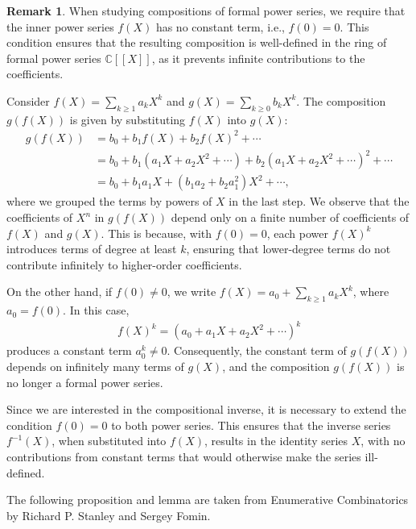 \documentclass[a4paper]{article}
\theoremstyle{definition}
\newtheorem*{remark}{Remark}
\begin{document}
\begin{remark}
    When studying compositions of formal power series, we require that the inner power series \(f(X)\) has no constant term, i.e., \(f(0) = 0\). This condition ensures that the resulting composition is well-defined in the ring of formal power series \(\mathbb{C}[[X]]\), as it prevents infinite contributions to the coefficients.

    Consider \(f(X) = \sum_{k \geq 1} a_k X^k\) and \(g(X) = \sum_{k \geq 0} b_k X^k\). The composition \(g(f(X))\) is given by substituting \(f(X)\) into \(g(X)\):
    \begin{align*}
        g(f(X)) &= b_0 + b_1 f(X) + b_2 f(X)^2 + \cdots \\
        &= b_0 + b_1 (a_1 X + a_2 X^2 + \cdots) + b_2 (a_1 X + a_2 X^2 + \cdots)^2 + \cdots \\
        &= b_0 + b_1 a_1 X + (b_1 a_2 + b_2 a_1^2) X^2 + \cdots,
    \end{align*}
    where we grouped the terms by powers of \(X\) in the last step. We observe that the coefficients of \(X^n\) in \(g(f(X))\) depend only on a finite number of coefficients of \(f(X)\) and \(g(X)\). This is because, with \(f(0) = 0\), each power \(f(X)^k\) introduces terms of degree at least \(k\), ensuring that lower-degree terms do not contribute infinitely to higher-order coefficients.

    On the other hand, if \(f(0) \neq 0\), we write \(f(X) = a_0 + \sum_{k \geq 1} a_k X^k\), where \(a_0 = f(0)\). In this case,
    \begin{align*}
        f(X)^k = (a_0 + a_1 X + a_2 X^2 + \cdots)^k
    \end{align*}
    produces a constant term \(a_0^k \neq 0\). Consequently, the constant term of \(g(f(X))\) depends on infinitely many terms of \(g(X)\), and the composition \(g(f(X))\) is no longer a formal power series.

    Since we are interested in the compositional inverse, it is necessary to extend the condition \(f(0) = 0\) to both power series. This ensures that the inverse series \(f^{-1}(X)\), when substituted into \(f(X)\), results in the identity series \(X\), with no contributions from constant terms that would otherwise make the series ill-defined.
\end{remark}

The following proposition and lemma are taken from Enumerative Combinatorics by Richard P. Stanley and Sergey Fomin.
\end{document}
